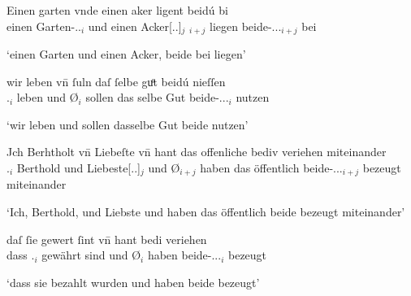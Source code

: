 \begin{exe}
\ex \label{ex:vvfinctrl}
	\begin{xlist}
	\ex \label{ex:vvfinctrl_1}
		\gll Einen garten vnde einen aker {} ligent
			beidú bi \textelp{} \\			
			einen Garten-\Acc.\Sg.\MascI{}$_i$ und einen
				Acker[\Acc.\Sg.\MascI]$_j$ \Rel$_{i+j}$ liegen
				beide-\Nom.\Pl.\NeutI.\St{}$_{i+j}$ bei {} \\
		\begin{taggedline}{\parencites(Freiburg i.\,Br., 1299)[\pno~3249, 417.4--5]{cao4}}
		\trans `einen Garten und einen Acker,  beide bei
			\textelp{} liegen'
		\end{taggedline}

	\ex \label{ex:vvfinctrl_2}
		\gll wir leben \textelp{} vn̄ {} ſuln daſ ſelbe guͦt
				beidú nieſſen \\				
			\Fpl\subMF.\Nom{}$_i$ leben {} und Ø$_i$ sollen das selbe Gut
				beide-\Nom.\Pl.\NeutMF.\St{}$_i$ nutzen \\
		\begin{taggedline}{\parencites(Neuenburg am Rhein, Kr.~Breisgau-Hochschwarzwald, 1299)[\pno~3376, 493.21--22]{cao4}}
		\trans `wir leben \textelp{} und  sollen
			dasselbe Gut beide nutzen'
		\end{taggedline}

	\ex \label{ex:vvfinctrl_3}
		\gll Jch Berhtholt vn̄ Liebeſte \textelp{} vn̄
				{} hant das offenliche bediv veriehen
				miteinander \\				
			\Fsg\subM.\Nom{}$_i$ Berthold und Liebeste[\Nom.\Sg.\FemF]$_j$ {}
				und Ø$_{i+j}$ haben das öffentlich
				beide-\Nom.\Pl.\NeutMF.\St{}$_{i+j}$ bezeugt miteinander \\
		\begin{taggedline}{\parencites(Kl.~Niedermünster, Dépt.~Bas-Rhin, 1277)[\pno~N~150, 108.31--32]{cao5}}
		\trans `Ich, Berthold, und Liebste \textelp{} und 
			haben das öffentlich beide bezeugt miteinander'
		\end{taggedline}

	\ex \label{ex:vvfinctrl_4}
		\gll daſ ſie gewert ſint \textelp{} vn̄ {} hant
				bedi veriehen \\				
			dass \Tpl\subMF.\Nom{}$_i$ gewährt sind {} und Ø$_i$ haben
				beide-\Nom.\Pl.\NeutMF.\St{}$_i$ bezeugt \\
		\begin{taggedline}{\parencites(Straßburg, 1281)[N~202, 156.16]{cao5}}
		\trans `dass sie bezahlt wurden \textelp{} und  haben
			beide bezeugt'
		\end{taggedline}
	\end{xlist}
\end{exe}

